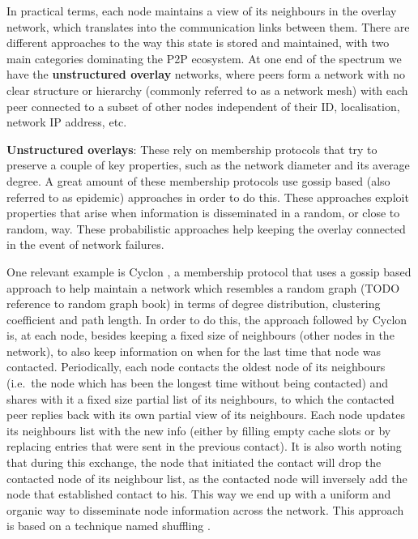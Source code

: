 In practical terms, each node maintains a view of its neighbours in the
overlay network, which translates into the communication links between
them. There are different approaches to the way this state is stored and
maintained, with two main categories dominating the P2P ecosystem. At
one end of the spectrum we have the \textbf{unstructured overlay}
networks, where peers form a network with no clear structure or
hierarchy (commonly referred to as a network mesh) with each peer
connected to a subset of other nodes independent of their ID,
localisation, network IP address, etc.
\bigskip

\textbf{Unstructured overlays}: These rely on membership protocols that
try to preserve a couple of key properties, such as the network diameter
and its average degree. A great amount of these membership protocols use
gossip based (also referred to as epidemic) approaches in order to do
this. These approaches exploit properties that arise when information is
disseminated in a random, or close to random, way. These probabilistic
approaches help keeping the overlay connected in the event of network
failures.

One relevant example is Cyclon \cite{Voulgaris2005a}, a membership
protocol that uses a gossip based approach to help maintain a network
which resembles a random graph (TODO reference to random graph book) in
terms of degree distribution, clustering coefficient and path length. In
order to do this, the approach followed by Cyclon is, at each node,
besides keeping a fixed size of neighbours (other nodes in the network),
to also keep information on when for the last time that node was
contacted. Periodically, each node contacts the oldest node of its
neighbours (i.e.~the node which has been the longest time without being
contacted) and shares with it a fixed size partial list of its
neighbours, to which the contacted peer replies back with its own
partial view of its neighbours. Each node updates its neighbours list
with the new info (either by filling empty cache slots or by replacing
entries that were sent in the previous contact). It is also worth noting
that during this exchange, the node that initiated the contact will drop
the contacted node of its neighbour list, as the contacted node will
inversely add the node that established contact to his. This way we end
up with a uniform and organic way to disseminate node information across
the network. This approach is based on a technique named shuffling \cite{Stavrou2002}.

